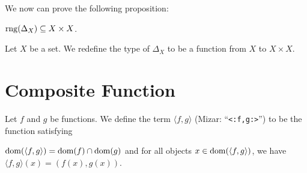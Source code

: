 \documentclass{article}
\begin{document}
We now can prove the following proposition:
\begin{thm}
\item\label{funct3:47} $\operatorname{rng}(\Delta_{X})\subseteq X\times X$.
\end{thm}

\begin{definition}
Let $X$ be a set.
We redefine the type of $\Delta_{X}$ to be a function from $X$ to
$X\times X$.
\end{definition}

\section{Composite Function}

\begin{definition}
Let $f$ and $g$ be functions.
We define the term $\langle f,g\rangle$ (Mizar: ``\verb#<:f,g:>#'') to be the function satisfying
\begin{defn}
\item $\operatorname{dom}(\langle f,g\rangle)=\operatorname{dom}(f)\cap\operatorname{dom}(g)$
  and for all objects $x\in\operatorname{dom}(\langle f,g\rangle)$, we have $\langle f,g\rangle(x)=(f(x),g(x))$.
\end{defn}
\end{definition}
\end{document}
